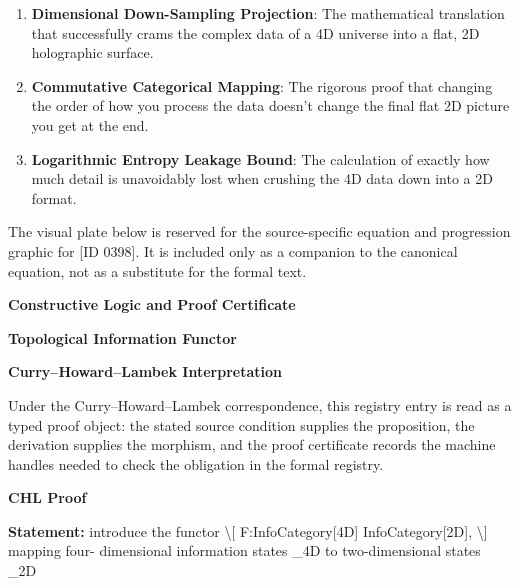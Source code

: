 \begin{enumerate}[leftmargin=1.6em,itemsep=6pt,topsep=4pt]
\item \textbf{Dimensional Down-Sampling Projection}: The mathematical translation that successfully crams the complex data of a 4D universe into a flat, 2D holographic surface.
\item \textbf{Commutative Categorical Mapping}: The rigorous proof that changing the order of how you process the data doesn't change the final flat 2D picture you get at the end.
\item \textbf{Logarithmic Entropy Leakage Bound}: The calculation of exactly how much detail is unavoidably lost when crushing the 4D data down into a 2D format.
\end{enumerate}

\begingroup\footnotesize\sloppy
The visual plate below is reserved for the source-specific equation and progression graphic for [ID 0398]. It is included only as a companion to the canonical equation, not as a substitute for the formal text.
\par\endgroup
\ifTZPDarkEdition
{}
\fi

\clearpage
\begingroup\tzpsupportsetup
\noindent\textbf{\fontsize{10.8pt}{12.8pt}\selectfont [ID 0398] Constructive Logic and Proof Certificate}\par
\noindent\textbf{\fontsize{10pt}{12pt}\selectfont Topological Information Functor}\par
\vspace{0.45em}
\begingroup
\footnotesize
\setlength{\parskip}{0.22em}
\setlength{\parindent}{0pt}
\noindent\textbf{Curry--Howard--Lambek Interpretation}\par
Under the Curry--Howard--Lambek correspondence, this registry entry is read as a typed proof
object: the stated source condition supplies the proposition, the derivation supplies the
morphism, and the proof certificate records the machine handles needed to check the obligation
in the formal registry.

\vspace{0.45em}
\noindent\textbf{CHL Proof}\par
\textbf{Statement:} introduce the functor \textbackslash{}[ F:InfoCategory[4D] InfoCategory[2D], \textbackslash{}] mapping four-
dimensional information states \_4D to two-dimensional states \_2D

